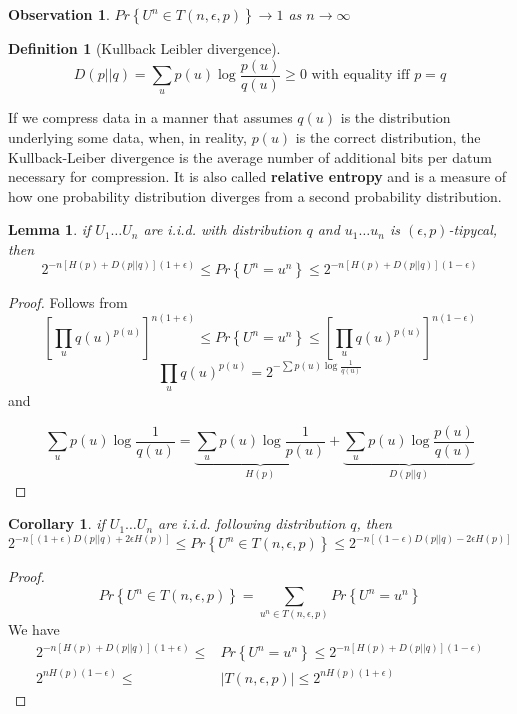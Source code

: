 \documentclass[twoside]{article}
\newtheorem{corollary}{Corollary}[theorem]
\newtheorem{observation}{Observation}[section]
\newtheorem{lemma}[theorem]{Lemma}
\newtheorem{definition}{Definition}[section]
\theoremstyle{definition} %
\renewcommand{\Pr}[1]{Pr\left\{#1\right\}}
\begin{document}
\begin{observation}
  $\Pr{U^n \in T(n, \epsilon, p)} \to 1$ as $n\to \infty$
\end{observation}

\begin{definition}[Kullback Leibler divergence]
  \[
    D(p||q) = \sum_u p(u) \log \frac {p(u)} {q(u)} \geq 0 \text{ with equality iff } p = q
  \]
\end{definition}

If we compress data in a manner that assumes $q(u)$ is the distribution underlying some data, when, in reality, $p(u)$ is the correct distribution, the Kullback-Leiber divergence is the average number of additional bits per datum necessary for compression. It is also called \textbf{relative entropy} and is a measure of how one probability distribution diverges from a second probability distribution.


\begin{lemma}
  if $U_1 \dots U_n$ are i.i.d. with distribution $q$ and $u_1 \dots u_n$ is $(\epsilon, p)$-tipycal, then
  \[
    2^{-n[H(p) + D(p||q)](1+\epsilon)}
    \leq
    \Pr{U^n = u^n}
  \leq
    2^{-n[H(p) + D(p||q)](1-\epsilon)}
  \]
\end{lemma}

\begin{proof}
  Follows from
\[
  \left[ \prod_u q(u)^{p(u)} \right]^{n(1+\epsilon)} \leq \Pr{U^n = u^n} \leq  \left[ \prod_u q(u)^{p(u)} \right]^{n(1-\epsilon)}
\]
\[
  \prod_u q(u)^{p(u)} = 2^{-\sum p(u) \log \frac 1 {q(u)}}
\]
and

\[
  \sum_u p(u) \log \frac 1 {q(u)} =
  \underbrace{\sum_u p(u) \log \frac 1 {p(u)}}_{H(p)} +
  \underbrace{\sum_u p(u) \log \frac {p(u)} {q(u)}}_{D(p||q)}
\]
\end{proof}


\begin{corollary}
  if $U_1 \dots U_n$ are i.i.d. following distribution $q$, then
  \[
    2^{-n[(1+\epsilon)D(p||q)+2\epsilon H(p)]}
    \leq
    \Pr{U^n \in T(n,\epsilon,p)}
    \leq
    2^{-n[(1-\epsilon)D(p||q) - 2\epsilon H(p)]}
  \]
\end{corollary}

\begin{proof}
  \[
    \Pr{U^n \in T(n,\epsilon,p)} = \sum_{u^n \in T(n, \epsilon, p)} \Pr{U^n = u^n}
  \]
  We have
  \begin{align*}
    2^{-n[H(p) + D(p||q)](1+\epsilon)}
    \leq
    &\Pr{U^n = u^n}
    \leq
    2^{-n[H(p) + D(p||q)](1-\epsilon)}\\
    2^{nH(p)(1-\epsilon)}
    \leq
    &|T(n, \epsilon, p)|
    \leq
    2^{nH(p)(1+\epsilon)}
  \end{align*}
\end{proof}
\end{document}

